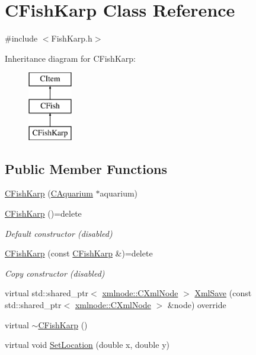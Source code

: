 \hypertarget{class_c_fish_karp}{}\section{C\+Fish\+Karp Class Reference}
\label{class_c_fish_karp}


{\ttfamily \#include $<$Fish\+Karp.\+h$>$}

Inheritance diagram for C\+Fish\+Karp\+:\begin{figure}[H]
\begin{center}
\leavevmode
\includegraphics[height=3.000000cm]{class_c_fish_karp}
\end{center}
\end{figure}
\subsection*{Public Member Functions}
\begin{DoxyCompactItemize}
\item 
\mbox{\hyperlink{class_c_fish_karp_a6852207eec4ed8fa617409cb2dff4681}{C\+Fish\+Karp}} (\mbox{\hyperlink{class_c_aquarium}{C\+Aquarium}} $\ast$aquarium)
\item 
\mbox{\label{class_c_fish_karp_a23fe85d81e982ce2c4346ed58b2bb60e}} 
\mbox{\hyperlink{class_c_fish_karp_a23fe85d81e982ce2c4346ed58b2bb60e}{C\+Fish\+Karp}} ()=delete
\begin{DoxyCompactList}\small\item\em Default constructor (disabled) \end{DoxyCompactList}\item 
\mbox{\label{class_c_fish_karp_a252e6c2d527dc7697ffa21514742c2e2}} 
\mbox{\hyperlink{class_c_fish_karp_a252e6c2d527dc7697ffa21514742c2e2}{C\+Fish\+Karp}} (const \mbox{\hyperlink{class_c_fish_karp}{C\+Fish\+Karp}} \&)=delete
\begin{DoxyCompactList}\small\item\em Copy constructor (disabled) \end{DoxyCompactList}\item 
virtual std\+::shared\+\_\+ptr$<$ \mbox{\hyperlink{classxmlnode_1_1_c_xml_node}{xmlnode\+::\+C\+Xml\+Node}} $>$ \mbox{\hyperlink{class_c_fish_karp_a182d8cce606be73a981bd140aca64ba8}{Xml\+Save}} (const std\+::shared\+\_\+ptr$<$ \mbox{\hyperlink{classxmlnode_1_1_c_xml_node}{xmlnode\+::\+C\+Xml\+Node}} $>$ \&node) override
\item 
virtual \mbox{\hyperlink{class_c_fish_karp_a8e89f8df98a055864179326657919755}{$\sim$\+C\+Fish\+Karp}} ()
\item 
virtual void \mbox{\hyperlink{class_c_fish_karp_ad16715dc334ff9bbb96906463c67efe1}{Set\+Location}} (double x, double y)
\end{DoxyCompactItemize}
